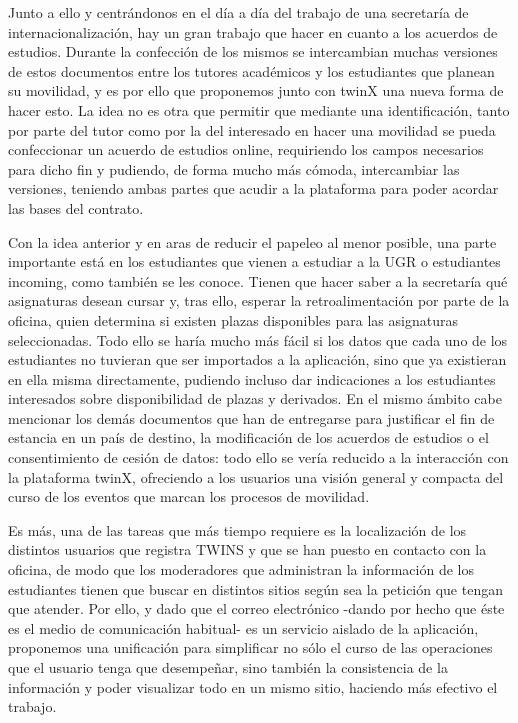 \documentclass[12pt]{article}
\begin{document}
Junto a ello y centrándonos en el día a día del trabajo de una secretaría de internacionalización, hay un gran trabajo que hacer en cuanto a los acuerdos de estudios. Durante la confección de los mismos se intercambian muchas versiones de estos documentos entre los tutores académicos y  los estudiantes que planean su movilidad, y es por ello que proponemos junto con twinX una nueva forma de hacer esto. La idea no es otra que permitir que mediante una identificación, tanto por parte del tutor como por la del interesado en hacer una movilidad se pueda confeccionar un acuerdo de estudios online, requiriendo los campos necesarios para dicho fin y pudiendo, de forma mucho más cómoda, intercambiar las versiones, teniendo ambas partes que acudir a la plataforma para poder acordar las bases del contrato.

Con la idea anterior y en aras de reducir el papeleo al menor posible, una parte importante está en los estudiantes que vienen a estudiar a la UGR o estudiantes incoming, como también se les conoce. Tienen que hacer saber a la secretaría qué asignaturas desean cursar y, tras ello, esperar la retroalimentación por parte de la oficina, quien determina si existen plazas disponibles para las asignaturas seleccionadas. Todo ello se haría mucho más fácil si los datos que cada uno de los estudiantes no tuvieran que ser importados a la aplicación, sino que ya existieran en ella misma directamente, pudiendo incluso dar indicaciones a los estudiantes interesados sobre disponibilidad de plazas y derivados. En el mismo ámbito cabe mencionar los demás documentos que han de entregarse para justificar el fin de estancia en un país de destino, la modificación de los acuerdos de estudios o el consentimiento de cesión de datos: todo ello se vería reducido a la interacción con la plataforma twinX, ofreciendo a los usuarios una visión general y compacta del curso de los eventos que marcan los procesos de movilidad.

Es más, una de las tareas que más tiempo requiere es la localización de los distintos usuarios que registra TWINS y que se han puesto en contacto con la oficina, de modo que los moderadores que administran la información de los estudiantes tienen que buscar en distintos sitios según sea la petición que tengan que atender. Por ello, y dado que el correo electrónico -dando por hecho que éste es el medio de comunicación habitual- es un servicio aislado de la aplicación, proponemos una unificación para simplificar no sólo el curso de las operaciones que el usuario tenga que desempeñar, sino  también la consistencia de la información y poder visualizar todo en un mismo sitio, haciendo más efectivo el trabajo.
\end{document}
